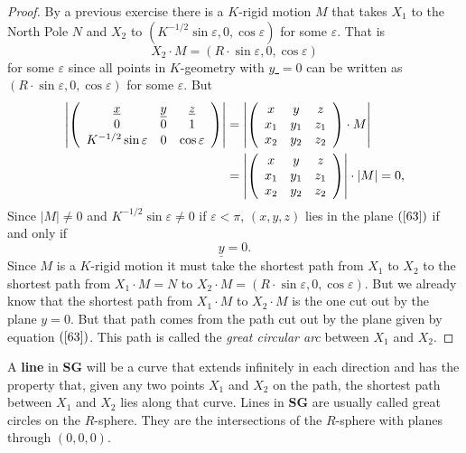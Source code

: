 \documentclass{ximera}
\begin{document}
\begin{proof}
By a previous exercise there is a $K$-rigid motion $M$ that takes $X_{1}$ to the
North Pole $N$ and $X_{2}$ to $\left(  K^{-1/2}\sin\varepsilon,0,\cos\varepsilon
\right)  $ for some $\varepsilon$. That is%
\[
X_{2}\cdot M=\left(  R\cdot \sin \varepsilon
,0,\cos \varepsilon\right)
\]
for some $\varepsilon$ since all points in $K$-geometry with \underline{$y$%
}$=0$ can be written as $\left(  R\cdot \sin %
\varepsilon,0,\cos \varepsilon\right)  $ for some $\varepsilon$. But%
\begin{align*}
\left\vert \left(
\begin{array}
[c]{ccc}%
\underline{x} & \underline{y} & \underline{z}\\
0 & 0 & 1\\
K^{-1/2}\sin\varepsilon & 0 & \cos\varepsilon
\end{array}
\right)  \right\vert  &  =\left\vert \left(
\begin{array}
[c]{ccc}%
x & y & z\\
x_{1} & y_{1} & z_{1}\\
x_{2} & y_{2} & z_{2}%
\end{array}
\right)  \cdot M\right\vert \\
&  =\left\vert \left(
\begin{array}
[c]{ccc}%
x & y & z\\
x_{1} & y_{1} & z_{1}\\
x_{2} & y_{2} & z_{2}%
\end{array}
\right)  \right\vert \cdot\left\vert M\right\vert =0,
\end{align*}
Since $\left\vert M\right\vert \neq0$ and $K^{-1/2}\sin\varepsilon\neq0$ if
$\varepsilon<\pi$, $\left(  x,y,z\right)  $ lies in the plane $\left(
\ref{63}\right)  $ if and only if
\[
\underline{y}=0.
\]
Since $M$ is a $K$-rigid motion it must take the shortest path from $X_{1}$ to
$X_{2}$ to the shortest path from $X_{1}\cdot M=N$ to $X_{2}\cdot M=\left(
R\cdot \sin \varepsilon,0,\cos %
\varepsilon\right)  $. But we already know that the shortest path from
$X_{1}\cdot M$ to $X_{2}\cdot M$ is the one cut out by the plane $y=0$. But
that path comes from the path cut out by the plane given by equation $\left(
\ref{63}\right)  $. This path is called the \textit{great circular arc}
between $X_{1}$ and $X_{2}$.
\end{proof}

\begin{definition}
A \textbf{line} in \textbf{SG} will be a curve that extends infinitely in each
direction and has the property that, given any two points $X_{1}$ and $X_{2}$
on the path, the shortest path between $X_{1}$ and $X_{2}$ lies along that
curve. Lines in \textbf{SG} are usually called great circles on the
$R$-sphere. They are the intersections of the $R$-sphere with planes through
$\left(  0,0,0\right)  $.
\end{definition}
\end{document}
